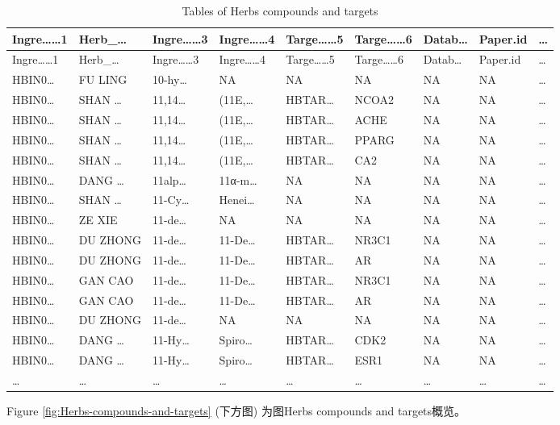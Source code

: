 \documentclass[
]{article}
\begin{document}
\begin{longtable}[]{@{}lllllllll@{}}
\caption{\label{tab:tables-of-Herbs-compounds-and-targets}Tables of Herbs compounds and targets}\tabularnewline
\toprule
Ingre\ldots\ldots1 & Herb\_\ldots{} & Ingre\ldots\ldots3 & Ingre\ldots\ldots4 & Targe\ldots\ldots5 & Targe\ldots\ldots6 & Datab\ldots{} & Paper.id & \ldots{}\tabularnewline
\midrule
\endfirsthead
\toprule
Ingre\ldots\ldots1 & Herb\_\ldots{} & Ingre\ldots\ldots3 & Ingre\ldots\ldots4 & Targe\ldots\ldots5 & Targe\ldots\ldots6 & Datab\ldots{} & Paper.id & \ldots{}\tabularnewline
\midrule
\endhead
HBIN0\ldots{} & FU LING & 10-hy\ldots{} & NA & NA & NA & NA & NA & \ldots{}\tabularnewline
HBIN0\ldots{} & SHAN \ldots{} & 11,14\ldots{} & (11E,\ldots{} & HBTAR\ldots{} & NCOA2 & NA & NA & \ldots{}\tabularnewline
HBIN0\ldots{} & SHAN \ldots{} & 11,14\ldots{} & (11E,\ldots{} & HBTAR\ldots{} & ACHE & NA & NA & \ldots{}\tabularnewline
HBIN0\ldots{} & SHAN \ldots{} & 11,14\ldots{} & (11E,\ldots{} & HBTAR\ldots{} & PPARG & NA & NA & \ldots{}\tabularnewline
HBIN0\ldots{} & SHAN \ldots{} & 11,14\ldots{} & (11E,\ldots{} & HBTAR\ldots{} & CA2 & NA & NA & \ldots{}\tabularnewline
HBIN0\ldots{} & DANG \ldots{} & 11alp\ldots{} & 11α-m\ldots{} & NA & NA & NA & NA & \ldots{}\tabularnewline
HBIN0\ldots{} & SHAN \ldots{} & 11-Cy\ldots{} & Henei\ldots{} & NA & NA & NA & NA & \ldots{}\tabularnewline
HBIN0\ldots{} & ZE XIE & 11-de\ldots{} & NA & NA & NA & NA & NA & \ldots{}\tabularnewline
HBIN0\ldots{} & DU ZHONG & 11-de\ldots{} & 11-De\ldots{} & HBTAR\ldots{} & NR3C1 & NA & NA & \ldots{}\tabularnewline
HBIN0\ldots{} & DU ZHONG & 11-de\ldots{} & 11-De\ldots{} & HBTAR\ldots{} & AR & NA & NA & \ldots{}\tabularnewline
HBIN0\ldots{} & GAN CAO & 11-de\ldots{} & 11-De\ldots{} & HBTAR\ldots{} & NR3C1 & NA & NA & \ldots{}\tabularnewline
HBIN0\ldots{} & GAN CAO & 11-de\ldots{} & 11-De\ldots{} & HBTAR\ldots{} & AR & NA & NA & \ldots{}\tabularnewline
HBIN0\ldots{} & DU ZHONG & 11-de\ldots{} & NA & NA & NA & NA & NA & \ldots{}\tabularnewline
HBIN0\ldots{} & DANG \ldots{} & 11-Hy\ldots{} & Spiro\ldots{} & HBTAR\ldots{} & CDK2 & NA & NA & \ldots{}\tabularnewline
HBIN0\ldots{} & DANG \ldots{} & 11-Hy\ldots{} & Spiro\ldots{} & HBTAR\ldots{} & ESR1 & NA & NA & \ldots{}\tabularnewline
\ldots{} & \ldots{} & \ldots{} & \ldots{} & \ldots{} & \ldots{} & \ldots{} & \ldots{} & \ldots{}\tabularnewline
\bottomrule
\end{longtable}

Figure \ref{fig:Herbs-compounds-and-targets} (下方图) 为图Herbs compounds and targets概览。
\end{document}
